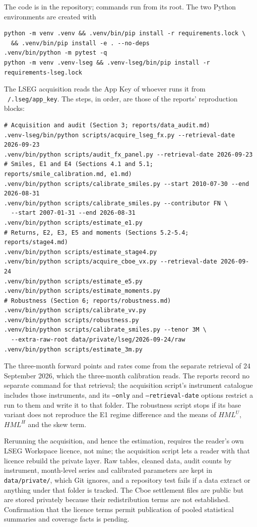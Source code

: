 \documentclass[11pt]{article}
\theoremstyle{result}
\newcommand{\HML}{\mathit{HML}}
\begin{document}
The code is in the repository; commands run from its root. The two Python environments are created with
{\small\begin{verbatim}
python -m venv .venv && .venv/bin/pip install -r requirements.lock \
  && .venv/bin/pip install -e . --no-deps
.venv/bin/python -m pytest -q
python -m venv .venv-lseg && .venv-lseg/bin/pip install -r requirements-lseg.lock
\end{verbatim}}
The LSEG acquisition reads the App Key of whoever runs it from \texttt{\string~/.lseg/app\_key}. The steps, in order, are those of the reports' reproduction blocks:
{\small\begin{verbatim}
# Acquisition and audit (Section 3; reports/data_audit.md)
.venv-lseg/bin/python scripts/acquire_lseg_fx.py --retrieval-date 2026-09-23
.venv/bin/python scripts/audit_fx_panel.py --retrieval-date 2026-09-23
# Smiles, E1 and E4 (Sections 4.1 and 5.1; reports/smile_calibration.md, e1.md)
.venv/bin/python scripts/calibrate_smiles.py --start 2010-07-30 --end 2026-08-31
.venv/bin/python scripts/calibrate_smiles.py --contributor FN \
  --start 2007-01-31 --end 2026-08-31
.venv/bin/python scripts/estimate_e1.py
# Returns, E2, E3, E5 and moments (Sections 5.2-5.4; reports/stage4.md)
.venv/bin/python scripts/estimate_stage4.py
.venv/bin/python scripts/acquire_cboe_vx.py --retrieval-date 2026-09-24
.venv/bin/python scripts/estimate_e5.py
.venv/bin/python scripts/estimate_moments.py
# Robustness (Section 6; reports/robustness.md)
.venv/bin/python scripts/calibrate_vv.py
.venv/bin/python scripts/robustness.py
.venv/bin/python scripts/calibrate_smiles.py --tenor 3M \
  --extra-raw-root data/private/lseg/2026-09-24/raw
.venv/bin/python scripts/estimate_3m.py
\end{verbatim}}
The three-month forward points and rates come from the separate retrieval of 24 September 2026, which the three-month calibration reads. The reports record no separate command for that retrieval; the acquisition script's instrument catalogue includes those instruments, and its \texttt{--only} and \texttt{--retrieval-date} options restrict a run to them and write it to that folder. The robustness script stops if its base variant does not reproduce the E1 regime difference and the means of $\HML^U$, $\HML^H$ and the skew term.

Rerunning the acquisition, and hence the estimation, requires the reader's own LSEG Workspace licence, not mine; the acquisition script lets a reader with that licence rebuild the private layer. Raw tables, cleaned data, audit counts by instrument, month-level series and calibrated parameters are kept in \texttt{data/private/}, which Git ignores, and a repository test fails if a data extract or anything under that folder is tracked. The Cboe settlement files are public but are stored privately because their redistribution terms are not established. Confirmation that the licence terms permit publication of pooled statistical summaries and coverage facts is pending.
\end{document}
